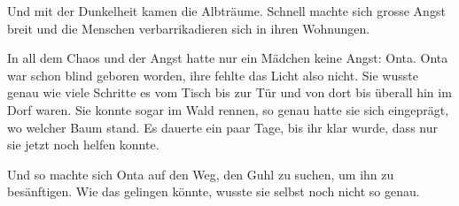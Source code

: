 \begin{swb}
Und mit der Dunkelheit kamen die Albträume. Schnell machte sich grosse Angst breit und die Menschen verbarrikadieren sich in ihren Wohnungen. 

In all dem Chaos und der Angst hatte nur ein Mädchen keine Angst: Onta. Onta war schon blind geboren worden, ihre fehlte das Licht also nicht. Sie wusste genau wie viele Schritte es vom Tisch bis zur Tür und von dort bis überall hin im Dorf waren. Sie konnte sogar im Wald rennen, so genau hatte sie sich eingeprägt, wo welcher Baum stand. Es dauerte ein paar Tage, bis ihr klar wurde, dass nur sie jetzt noch helfen konnte.

Und so machte sich Onta auf den Weg, den Guhl zu suchen, um ihn zu besänftigen. Wie das gelingen könnte, wusste sie selbst noch nicht so genau. 


\end{swb}
